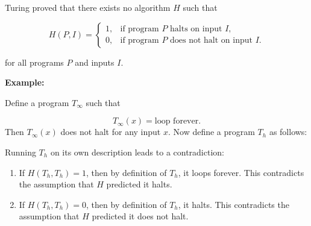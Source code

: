 \documentclass[12pt,a4paper,openany]{article}
\begin{document}
Turing proved that there exists no algorithm $H$ such that

\[
H(P, I) = \begin{cases} 
1, & \text{if program $P$ halts on input $I$,} \\ 
0, & \text{if program $P$ does not halt on input $I$.} 
\end{cases}
\]

for all programs $P$ and inputs $I$.


\textbf{Example:} 

Define a program $T_{\infty}$ such that

\[
T_{\infty}(x) = \text{loop forever}.
\]
Then $T_{\infty}(x)$ does not halt for any input $x$. Now define a program $T_h$ as follows:

\vspace{1em}

\begin{center}
\end{center}

\vspace{1em}

Running $T_h$ on its own description leads to a contradiction:

\begin{enumerate}
    \item If $H(T_h, T_h) = 1$, then by definition of $T_h$, it loops forever. This contradicts the assumption that $H$ predicted it halts.
    \item If $H(T_h, T_h) = 0$, then by definition of $T_h$, it halts. This contradicts the assumption that $H$ predicted it does not halt.
\end{enumerate}
\end{document}
